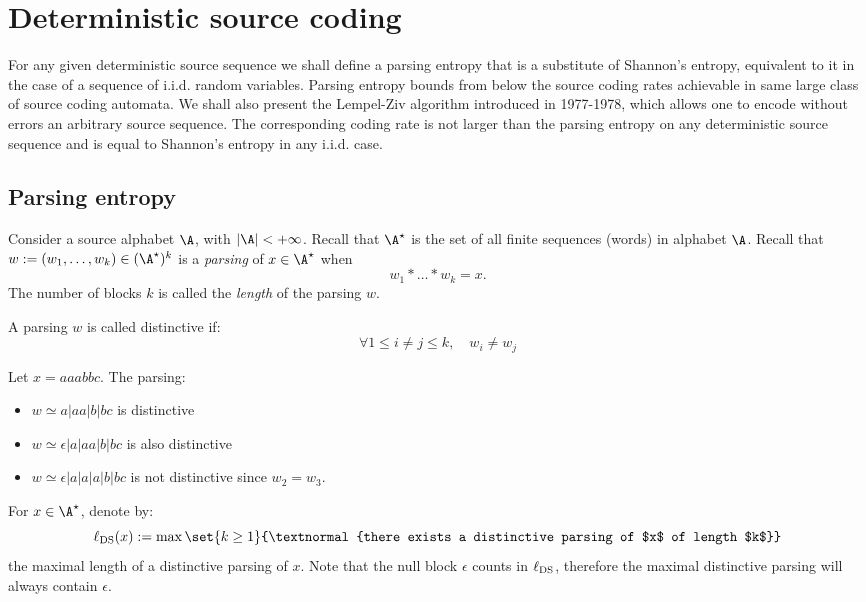 \documentclass[toc]{../cs-classes/cs-classes}
\newcommand*{\lds}{\ell_{\textnormal{DS}}}
\begin{document}
\section{Deterministic source coding}
For any given deterministic source sequence we shall define a parsing entropy that is a substitute of Shannon's entropy, equivalent to it in the case of a sequence of i.i.d. random variables. Parsing entropy bounds from below the source coding rates achievable in same large class of source coding automata. We shall also present the Lempel-Ziv algorithm introduced in 1977-1978, which allows one to encode without errors an arbitrary source sequence. The corresponding coding rate is not larger than the parsing entropy on any deterministic source sequence and is equal to Shannon's entropy in any i.i.d. case.

\subsection{Parsing entropy}
Consider a source alphabet $\A$, with $|\A|<+\infty$. Recall that $\A^\star$ is the set of all finite sequences (words) in alphabet $\A$. Recall that $w:=(w_1, \dots, w_k)\in(\A^\star)^k$ is a \emph{parsing} of $x\in\A^\star$ when
\begin{equation*}
    w_1*\dots *w_k=x.
\end{equation*}
The number of blocks $k$ is called the \emph{length} of the parsing $w$.

\begin{definition}
    A parsing $w$ is called distinctive if:
    \begin{equation*}
        \forall 1\leq i\neq j\leq k, \quad w_i\neq w_j
    \end{equation*}
\end{definition}

\begin{example}
    Let $x=aaabbc$. The parsing:
    \begin{itemize}
        \item $w \simeq a|aa|b|bc$ is distinctive
        \item $w \simeq \epsilon|a|aa|b|bc$ is also distinctive
        \item $w \simeq \epsilon|a|a|a|b|bc$ is not distinctive since $w_2=w_3$.
    \end{itemize}
\end{example}

\begin{definition}
    For $x\in\A^\star$, denote by:
    \begin{equation*}
        \lds(x) := \max \set{k\geq 1}{\textnormal{there exists a distinctive parsing of $x$ of length $k$}}
    \end{equation*}
    the maximal length of a distinctive parsing of $x$. Note that the null block $\epsilon$ counts in $\lds$, therefore the maximal distinctive parsing will always contain $\epsilon$.
\end{definition}
\end{document}
